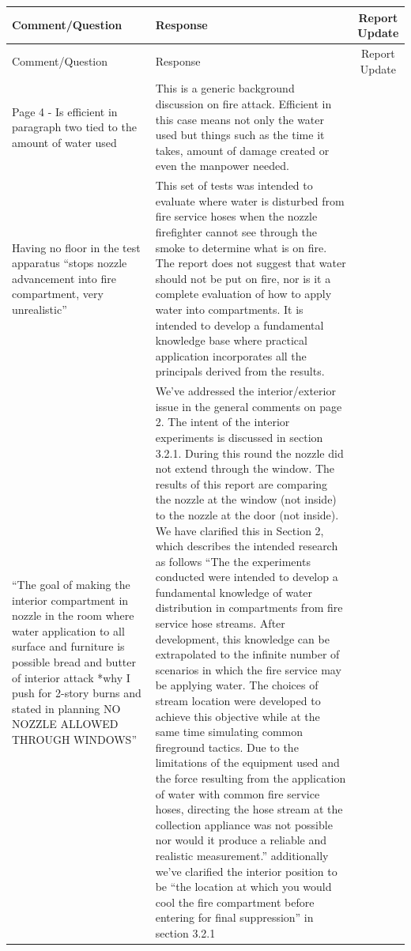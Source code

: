 \documentclass[12pt,oneside]{book}
\begin{document}
\begin{landscape}
\begin{longtable}{|L{4in}|L{3.75in}|c|}
		\hline
		Comment/Question & Response & Report Update \\ 
		\toprule[1.0pt] \endfirsthead
		\hline
		Comment/Question & Response & Report Update \\ 
		\toprule[1.0pt] \endhead
		\hline
		Page 4 - Is efficient in paragraph two tied to the amount of water used &
		This is a generic background discussion on fire attack. Efficient in this case means not only the water used but things such as the time it takes, amount of damage created or even the manpower needed. & \\
		
		\hline
		Having no floor in the test apparatus ``stops nozzle advancement into fire compartment, very unrealistic'' & 
		This set of tests was intended to evaluate where water is disturbed from fire service hoses when the nozzle firefighter cannot see through the smoke to determine what is on fire. The report does not suggest that water should not be put on fire, nor is it a complete evaluation of how to apply water into compartments. It is intended to develop a fundamental knowledge base where practical application incorporates all the principals derived from the results. & \\

		\hline
		``The goal of making the interior compartment in nozzle in the room where water application to all surface and furniture is possible bread and butter of interior attack *why I push for 2-story burns and stated in planning NO NOZZLE ALLOWED THROUGH WINDOWS'' & 
		We've addressed the interior/exterior issue in the general comments on page 2. The intent of the interior experiments is discussed in section 3.2.1. During this round the nozzle did not extend through the window. The results of this report are comparing the nozzle at the window (not inside) to the nozzle at the door (not inside). We have clarified this in Section 2, which describes the intended research as follows ``The the experiments conducted were intended to develop a fundamental knowledge of water distribution in compartments from fire service hose streams. After development, this knowledge can be extrapolated to the infinite number of scenarios in which the fire service may be applying water. The choices of stream location were developed to achieve this objective while at the same time simulating common fireground tactics. Due to the limitations of the equipment used and the force resulting from the application of water with common fire service hoses, directing the hose stream at the collection appliance was not possible nor would it produce a reliable and realistic measurement.'' additionally we've clarified the interior position to be ``the location at which you would cool the fire compartment before entering for final suppression'' in section 3.2.1 & \checkmark\\


\end{longtable}
\end{landscape}
\end{document}
